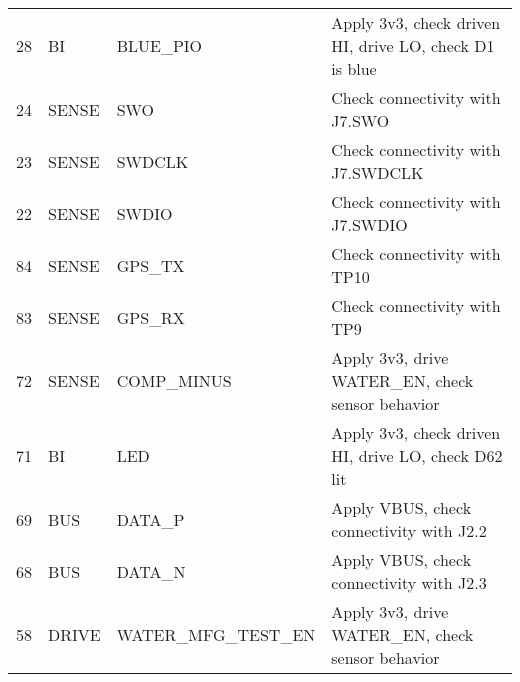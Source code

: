 \documentclass{article}
\begin{document}
\begin{table}[ht]
\begin{tabular}{@{}lllp{}@{}}
        28    & BI        & BLUE\_PIO            & Apply 3v3, check driven HI, drive LO, check D1 is blue                                                                                                              \\
        24    & SENSE     & SWO                  & Check connectivity with J7.SWO                                                                                                                                      \\
        23    & SENSE     & SWDCLK               & Check connectivity with J7.SWDCLK                                                                                                                                   \\
        22    & SENSE     & SWDIO                & Check connectivity with J7.SWDIO                                                                                                                                    \\
        84    & SENSE     & GPS\_TX              & Check connectivity with TP10                                                                                                                                        \\
        83    & SENSE     & GPS\_RX              & Check connectivity with TP9                                                                                                                                         \\
        72    & SENSE     & COMP\_MINUS          & Apply 3v3, drive WATER\_EN, check sensor behavior                                                                                                                   \\
        71    & BI        & LED                  & Apply 3v3, check driven HI, drive LO, check D62 lit                                                                                                                 \\
        69    & BUS       & DATA\_P              & Apply VBUS, check connectivity with J2.2                                                                                                                            \\
        68    & BUS       & DATA\_N              & Apply VBUS, check connectivity with J2.3                                                                                                                            \\
        58    & DRIVE     & WATER\_MFG\_TEST\_EN & Apply 3v3, drive WATER\_EN, check sensor behavior                                                                                                                   \\

\end{tabular}
\end{table}
\end{document}

